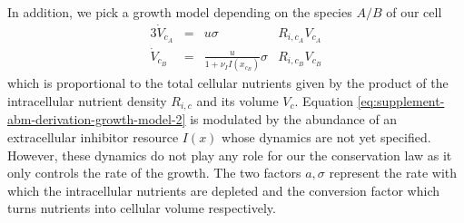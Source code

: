 In addition, we pick a growth model depending on the species $A/B$ of our cell
\begin{alignat}{3}
    \dot{V}_{c_A} &= &u \sigma &R_{i,c_A} V_{c_A}
    \label{eq:supplement-abm-derivation-growth-model-1}\\
    \dot{V}_{c_B} &= &\frac{u}{1+\nu_I I(x_{c_B})} \sigma &R_{i,c_B} V_{c_B}
    \label{eq:supplement-abm-derivation-growth-model-2}
\end{alignat}
which is proportional to the total cellular nutrients given by the product of the
intracellular nutrient density $R_{i,c}$ and its volume $V_c$.
Equation \ref{eq:supplement-abm-derivation-growth-model-2} is modulated by the abundance
of an extracellular inhibitor resource $I(x)$ whose dynamics are not yet specified.
However, these dynamics do not play any role for our the conservation law as it only
controls the rate of the growth.
The two factors $a,\sigma$ represent the rate with which the intracellular nutrients are
depleted and the conversion factor which turns nutrients into cellular volume respectively.
%
%
\vfill
\pagebreak
